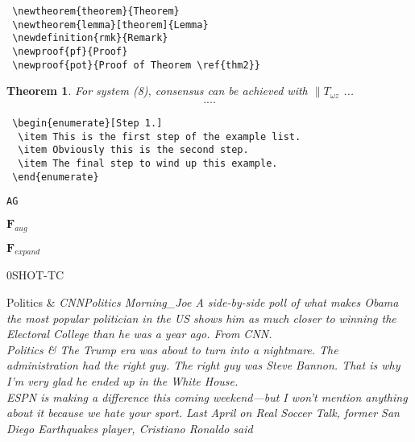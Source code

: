 \begin{verbatim}
 \newtheorem{theorem}{Theorem}
 \newtheorem{lemma}[theorem]{Lemma}
 \newdefinition{rmk}{Remark}
 \newproof{pf}{Proof}
 \newproof{pot}{Proof of Theorem \ref{thm2}}
\end{verbatim}


\newtheorem{theorem}{Theorem}

\begin{theorem}
For system (8), consensus can be achieved with 
$\|T_{\omega z}$ ...
\begin{eqnarray}\label{10}
....
\end{eqnarray}
\end{theorem}


\begin{verbatim}
 \begin{enumerate}[Step 1.]
  \item This is the first step of the example list.
  \item Obviously this is the second step.
  \item The final step to wind up this example.
 \end{enumerate}
\end{verbatim}





{\verb|AG|}


$\mathbf{F}_{aug}$

$\mathbf{F}_{expand}$


\textsc{0SHOT-TC}



{Politics} &  \itshape{CNNPolitics Morning_Joe A side-by-side poll of what makes Obama the most popular politician in the US shows him as much closer to winning the Electoral College than he was a year ago. From CNN.} \\
{Politics}  & \itshape{The Trump era was about to turn into a nightmare. The administration had the right guy. The right guy was Steve Bannon. That is why I'm very glad he ended up in the White House.} \\


ESPN is making a difference this coming weekend—but I won't mention anything about it because we hate your sport. Last April on Real Soccer Talk, former San Diego Earthquakes player, Cristiano Ronaldo said




\toprule

\midrule 

\midrule
\bottomrule

